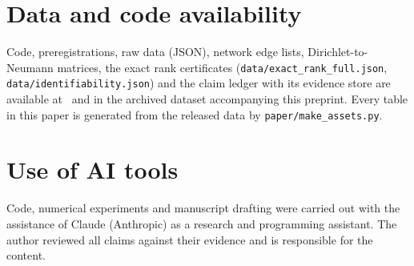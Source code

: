 \documentclass[11pt,a4paper]{article}
\begin{document}
\section*{Data and code availability}
Code, preregistrations, raw data (JSON), network edge lists, Dirichlet-to-Neumann matrices, the exact rank
certificates (\texttt{data/exact\_rank\_full.json}, \texttt{data/identifiability.json}) and the claim ledger with
its evidence store are available at~\cite{TrackHRepo} and in the archived dataset accompanying this preprint. Every table in this paper is generated
from the released data by \texttt{paper/make\_assets.py}.

\section*{Use of AI tools}
Code, numerical experiments and manuscript drafting were carried out with the assistance of Claude (Anthropic) as a
research and programming assistant. The author reviewed all claims against their evidence and is responsible for
the content.



\end{document}
